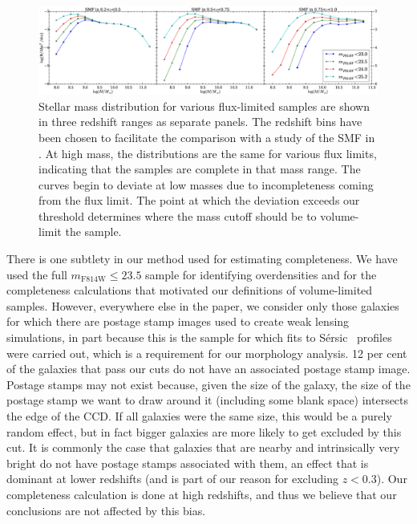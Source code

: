 \documentclass[twocolumn,useAMS,usenatbib]{mn2e}
\newcommand{\sersic}{S\'{e}rsic }
\begin{document}
\begin{figure}
 \centering
 \includegraphics[width=2.2\columnwidth]{SMF}
 \caption{Stellar mass distribution for various flux-limited samples
   are shown in three redshift ranges as separate panels. The redshift
   bins have been chosen to facilitate the comparison with  
          a study of the SMF in \protect\cite{Tomczak_SMF}. At high mass, the
          distributions are the same for various flux limits,
          indicating that the samples are complete in that mass
          range. The curves begin to deviate at low masses due to
          incompleteness coming from the flux limit.  The point at
          which the deviation exceeds our threshold determines where the mass cutoff should be to volume-limit the sample.
          }
 \label{fig:smf}
\end{figure}

There is one subtlety in our method used for estimating
completeness. We have used the full $m_\text{F814W}\le23.5$ sample
for identifying
overdensities and for the completeness calculations that motivated our
definitions of volume-limited samples.  However, everywhere else in the paper, we consider only those galaxies for which there are postage stamp
images used to create weak lensing simulations, in part because this is the
sample for which fits to \sersic\ profiles were carried out, which is a
requirement for our morphology analysis.  
12 per cent of the galaxies that pass our cuts do not have an
associated postage stamp image.
Postage stamps may not exist because, given the size of the galaxy,
the size of the postage stamp we want to draw around it (including
some blank space) intersects the edge of the CCD.
If all galaxies were the same size, this would be a purely random effect, but in fact bigger galaxies are more likely to get excluded by this cut. 
It is commonly the case that  galaxies that are nearby and
intrinsically very bright do not have postage stamps associated with
them, an effect that is dominant at lower redshifts (and is part of
our reason for excluding $z<0.3$). 
Our completeness calculation is done at high redshifts, and thus we
believe that our conclusions are not affected by this bias.  
\end{document}
